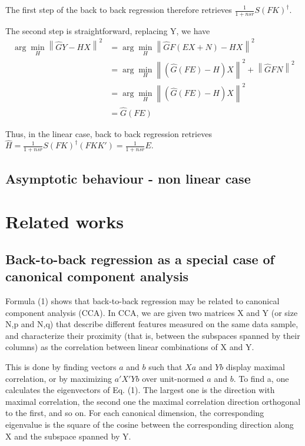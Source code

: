 \documentclass{article}
\begin{document}
The first step of the back to back regression therefore retrieves $\frac{1}{1+nsr} S (FK)^\dagger$.

The second step is straightforward, replacing Y, we have
\begin{equation}
\begin{aligned}
\arg \min_H \left \| \hat GY - HX \right \|^2 &=\arg  \min_H \left \| \hat GF(EX+N) - HX \right \|^2 \\
&=\arg \min_H \left \| (\hat G(FE)-H)X \right \| ^2 + \left \| \hat GFN \right \| ^2\\
&= \arg \min_H \left \| (\hat G(FE)-H)X \right \| ^2\\
&=\hat G (FE)
\end{aligned}
\end{equation}

Thus, in the linear case, back to back regression retrieves $\hat H = \frac{1}{1+nsr} S (FK)^{\dagger}(FKK') = \frac{1}{1+nsr} E$.

\subsection{Asymptotic behaviour - non linear case}

\section{Related works}
\subsection{Back-to-back regression as a special case of canonical component analysis}
Formula (1) shows that back-to-back regression may be related to canonical component analysis (CCA).
%
In CCA, we are given two matrices X and Y (or size N,p and N,q) that describe different features measured on the same data sample, and characterize their proximity (that is, between the subspaces spanned by their columns) as the correlation between linear combinations of X and Y.

This is done by finding vectors $a$ and $b$ such that $Xa$ and $Yb$ display maximal correlation, or by maximizing $a'X'Yb$ over unit-normed $a$ and $b$.
%
To find a, one calculates the eigenvectors of Eq. (1).
%
The largest one is the direction with maximal correlation, the second one the maximal correlation direction orthogonal to the first, and so on.
%
For each canonical dimension, the corresponding eigenvalue is the square of the cosine between the corresponding direction along X and the subspace spanned by Y.
\end{document}
